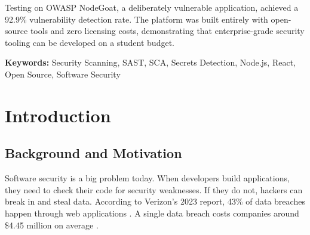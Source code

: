 \documentclass[12pt,a4paper]{report}
\begin{document}
Testing on OWASP NodeGoat, a deliberately vulnerable application, achieved a 92.9\% vulnerability detection rate. The platform was built entirely with open-source tools and zero licensing costs, demonstrating that enterprise-grade security tooling can be developed on a student budget.

\textbf{Keywords:} Security Scanning, SAST, SCA, Secrets Detection, Node.js, React, Open Source, Software Security

\tableofcontents

\listoftables
{}

\listoffigures
{}


\pagestyle{fancy}
\fancyhf{}
\fancyhead[L]{\leftmark}
\fancyhead[R]{\thepage}
\renewcommand{\headrulewidth}{0.4pt}

\chapter{Introduction}
\label{chap:introduction}

\section{Background and Motivation}

Software security is a big problem today. When developers build applications, they need to check their code for security weaknesses. If they do not, hackers can break in and steal data. According to Verizon's 2023 report, 43\% of data breaches happen through web applications \cite{verizon2023}. A single data breach costs companies around \$4.45 million on average \cite{ponemon2023}.
\end{document}
